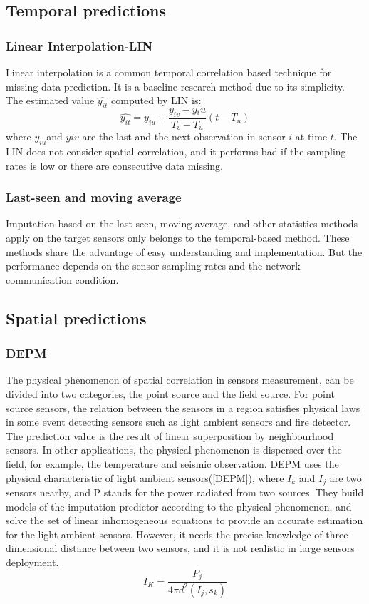 \subsection{Temporal predictions}
\subsubsection{Linear Interpolation-LIN}
Linear interpolation is a common temporal correlation based technique for missing data prediction. It is a baseline research method due to its simplicity. The estimated value $\hat{y_{it}}$ computed by LIN is:
\begin{equation}
\hat{y_{it}} = y_{iu} + \frac{y_{iv}-y{_iu}}{T_v-T_u}(t-T_u)
\end{equation}
where $y_{iu}$and $y{iv}$ are the last and the next observation in sensor $i$ at time $t$. The LIN does not consider spatial correlation, and it performs bad if the sampling rates is low or there are consecutive data missing. 
\subsubsection{Last-seen and moving average}
Imputation based on the last-seen, moving average, and other statistics methods apply on the target sensors only belongs to the temporal-based method. These methods share the advantage of easy understanding and implementation. But the performance depends on the sensor sampling rates and the network communication condition.   
\subsection{Spatial predictions}

\subsubsection{DEPM}
The physical phenomenon of spatial correlation in sensors measurement, can be divided into two categories, the point source and the field source\cite{viran:spatialtemporal}. For point source sensors, the relation between the sensors in a region satisfies physical laws in some event detecting sensors such as light ambient sensors and fire detector. The prediction value is the result of linear superposition by neighbourhood sensors. In other applications, the physical phenomenon is dispersed over the field, for example, the temperature and seismic observation. DEPM\cite{LI:DESM} uses the physical characteristic of light ambient sensors(\ref{DEPM}), where $I_k$ and $I_j$ are two sensors nearby, and P stands for the power radiated from two sources. They build models of the imputation predictor according to the physical phenomenon, and solve the set of linear inhomogeneous equations to provide an accurate estimation for the light ambient sensors. However, it needs the precise knowledge of three-dimensional distance between two sensors, and it is not realistic in large sensors deployment.
\begin{equation}
I_K =\frac{P_j}{4\pi d^2(I_j,s_k)}
\label{DEPM}
\end{equation} 
